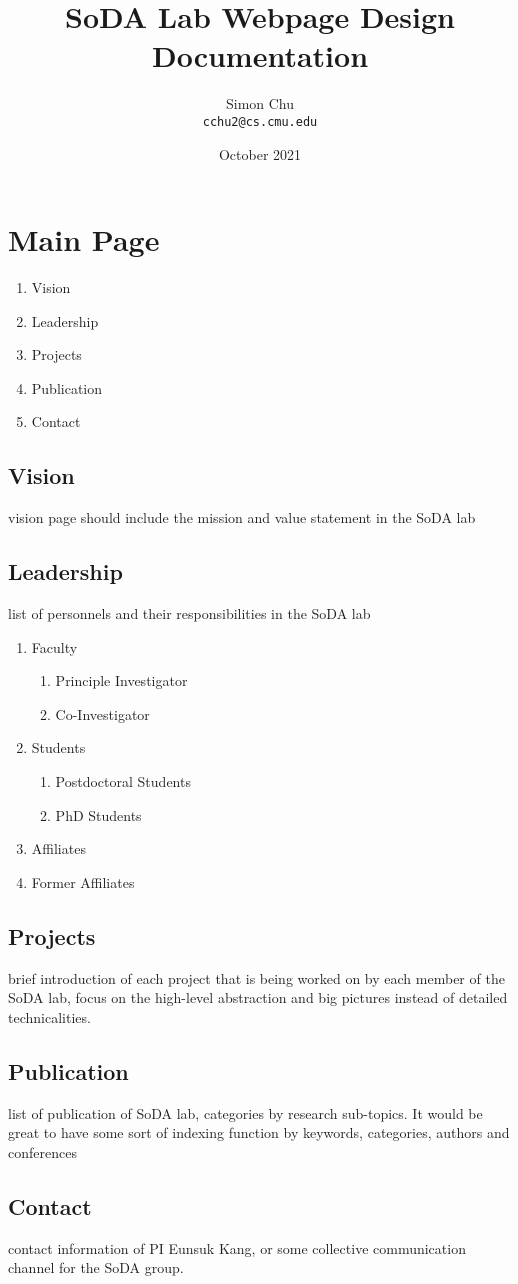 \documentclass{article}
\title{SoDA Lab Webpage Design Documentation}
\author{
  Simon Chu\\
  \texttt{cchu2@cs.cmu.edu}
}
\date{October 2021}
\begin{document}
\maketitle

\section{Main Page}
\begin{enumerate}
    \item Vision
    \item Leadership
    \item Projects
    \item Publication
    \item Contact
\end{enumerate}

\subsection{Vision}
vision page should include the mission and value statement in the SoDA lab

\subsection{Leadership}
list of personnels and their responsibilities in the SoDA lab
\begin{enumerate}
  \item Faculty
    \begin{enumerate}
      \item Principle Investigator
      \item Co-Investigator 
    \end{enumerate}
  \item Students
    \begin{enumerate}
      \item Postdoctoral Students
      \item PhD Students
    \end{enumerate}
  \item Affiliates
  \item Former Affiliates
\end{enumerate}

\subsection{Projects}
brief introduction of each project that is being worked on by each member of the SoDA lab, focus on the high-level abstraction and big pictures instead of detailed technicalities.

\subsection{Publication}
list of publication of SoDA lab, categories by research sub-topics. It would be great to have some sort of indexing function by keywords, categories, authors and conferences

\subsection{Contact}
contact information of PI Eunsuk Kang, or some collective communication channel for the SoDA group.
\end{document}
